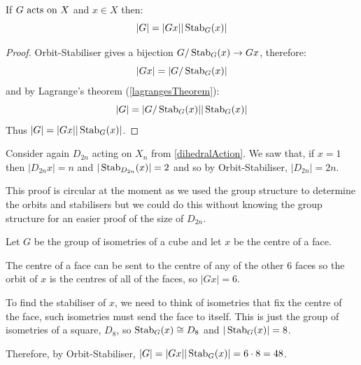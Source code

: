 \documentclass[../main.tex]{subfiles}
\begin{document}
\begin{corollary}
  If $G \text{ acts on } X$ and $x \in X$ then:
  \[
    |G| = |Gx||\operatorname{Stab}_G(x)|
  \]
\end{corollary}
\begin{proof}
  Orbit-Stabiliser gives a bijection $G/\operatorname{Stab}_G(x) \to Gx$, therefore:
  \[
    |Gx| = |G / \operatorname{Stab}_G(x)|
  \]
  and by Lagrange's theorem (\cref{lagrangesTheorem}):
  \[
    |G| = |G/\operatorname{Stab}_G(x)||\operatorname{Stab}_G(x)|
  \]
  Thus $|G| = |Gx||\operatorname{Stab}_G(x)|$.
\end{proof}
\begin{example}
  Consider again $D_{2n}$ acting on $X_n$ from \cref{dihedralAction}.
  We saw that, if $x = 1$ then $|D_{2n}x| = n$ and $|\operatorname{Stab}_{D_{2n}}(x)| = 2$ and so by Orbit-Stabiliser, $|D_{2n}| = 2n$.

  This proof is circular at the moment as we used the group structure to determine the orbits and stabilisers but we could do this without knowing the group structure for an easier proof of the size of $D_{2n}$.
\end{example}
\begin{example}
  \label{cubeSymmetries}
  Let $G$ be the group of isometries of a cube and let $x$ be the centre of a face.

  The centre of a face can be sent to the centre of any of the other $6$ faces so the orbit of $x$ is the centres of all of the faces, so $|Gx| = 6$.

  To find the stabiliser of $x$, we need to think of isometries that fix the centre of the face, such isometries must send the face to itself.
  This is just the group of isometries of a square, $D_{8}$, so $\operatorname{Stab}_G(x) \cong D_8$ and $|\operatorname{Stab}_G(x)| = 8$.

  Therefore, by Orbit-Stabiliser, $|G| = |Gx||\operatorname{Stab}_G(x)| = 6 \cdot 8 = 48$.
\end{example}
\end{document}
